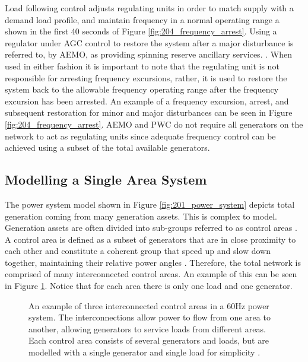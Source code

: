 \newpage

Load following control adjusts regulating units in order to match supply with a demand load profile, and maintain frequency in a normal operating range a shown in the first 40 seconds of Figure \ref{fig:204_frequency_arrest}. Using a regulator under AGC control to restore the system after a major disturbance is referred to, by AEMO, as providing spinning reserve ancillary services. \cite{AEMOancilliaryserv}. When used in either fashion it is important to note that the regulating unit is not responsible for arresting frequency excursions, rather, it is used to restore the system back to the allowable frequency operating range after the frequency excursion has been arrested. An example of a frequency excursion, arrest, and subsequent restoration for minor and major disturbances can be seen in Figure \ref{fig:204_frequency_arrest}. AEMO and PWC do not require all generators on the network to act as regulating units since adequate frequency control can be achieved using a subset of the total available generators.


\subsection{Modelling a Single Area System}\label{sec:modelling_a_single_area}
The power system model shown in Figure \ref{fig:201_power_system} depicts total generation coming from many generation assets. This is complex to model. Generation assets are often divided into sub-groups referred to as control areas \cite{Kothari2011}. A control area is defined as a subset of generators that are in close proximity to each other and constitute a coherent group that speed up and slow down together, maintaining their relative power angles \cite{Kothari2011}. Therefore, the total network is comprised of many interconnected control areas. An example of this can be seen in Figure \ref{fig:2105_multiple_area_system}. Notice that for each area there is only one load and one generator.
\begin{figure}[ht]
	\centering
	\resizebox{12cm}{!}{}
	\caption[Multiple area power system]{An example of three interconnected control areas in a 60$\si{\hertz}$ power system. The interconnections allow power to flow from one area to another, allowing generators to service loads from different areas. Each control area consists of several generators and loads, but are modelled with a single generator and single load for simplicity \cite{Grainger1994}.}
	\label{fig:2105_multiple_area_system}
\end{figure}

